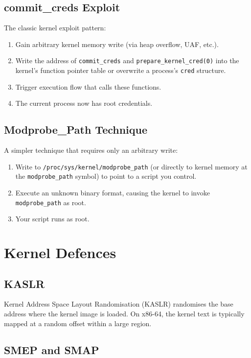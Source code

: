\subsection{commit\_creds Exploit}

The classic kernel exploit pattern:

\begin{enumerate}
	\item Gain arbitrary kernel memory write (via heap overflow, UAF, etc.).
	\item Write the address of \texttt{commit\_creds} and \texttt{prepare\_kernel\_cred(0)} into the kernel's function pointer table or overwrite a process's \texttt{cred} structure.
	\item Trigger execution flow that calls these functions.
	\item The current process now has root credentials.
\end{enumerate}

\subsection{Modprobe\_Path Technique}

A simpler technique that requires only an arbitrary write:

\begin{enumerate}
	\item Write to \texttt{/proc/sys/kernel/modprobe\_path} (or directly to kernel memory at the \texttt{modprobe\_path} symbol) to point to a script you control.
	\item Execute an unknown binary format, causing the kernel to invoke \texttt{modprobe\_path} as root.
	\item Your script runs as root.
\end{enumerate}

\section{Kernel Defences}

\subsection{KASLR}

Kernel Address Space Layout Randomisation (KASLR) randomises the base address where the kernel image is loaded. On x86-64, the kernel text is typically mapped at a random offset within a large region.

\subsection{SMEP and SMAP}

